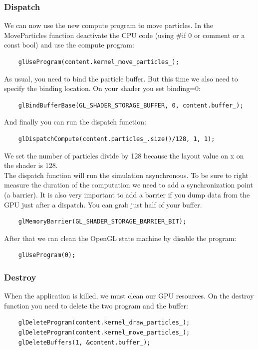 \documentclass{article}
\begin{document}
\subsubsection{Dispatch}
We can now use the new compute program to move particles. In the MoveParticles function deactivate the CPU code (using \#if 0 or comment or a const bool) and use the compute program:
\begin{lstlisting}
	glUseProgram(content.kernel_move_particles_);
\end{lstlisting}
 As usual, you need to bind the particle buffer. But this time we also need to specify the binding location. On your shader you set binding=0:
\begin{lstlisting}
	glBindBufferBase(GL_SHADER_STORAGE_BUFFER, 0, content.buffer_);
\end{lstlisting}
And finally you can run the dispatch function:
\begin{lstlisting}
	glDispatchCompute(content.particles_.size()/128, 1, 1);
\end{lstlisting}
We set the number of particles divide by 128 because the layout value on x on the shader is 128.\\
The dispatch function will run the simulation asynchronous. To be sure to right measure the duration of the computation we need to add a synchronization point (a barrier). It is also very important to add a barrier if you dump data from the GPU just after a dispatch. You can grab just half of your buffer.
\begin{lstlisting}
	glMemoryBarrier(GL_SHADER_STORAGE_BARRIER_BIT);
\end{lstlisting}
After that we can clean the OpenGL state machine by disable the program:
\begin{lstlisting}
	glUseProgram(0);
\end{lstlisting}

\subsubsection{Destroy}
When the application is killed, we must clean our GPU resources. On the destroy function you need to delete the two program and the buffer:
\begin{lstlisting}
	glDeleteProgram(content.kernel_draw_particles_);
	glDeleteProgram(content.kernel_move_particles_);
	glDeleteBuffers(1, &content.buffer_);
\end{lstlisting}
\end{document}
